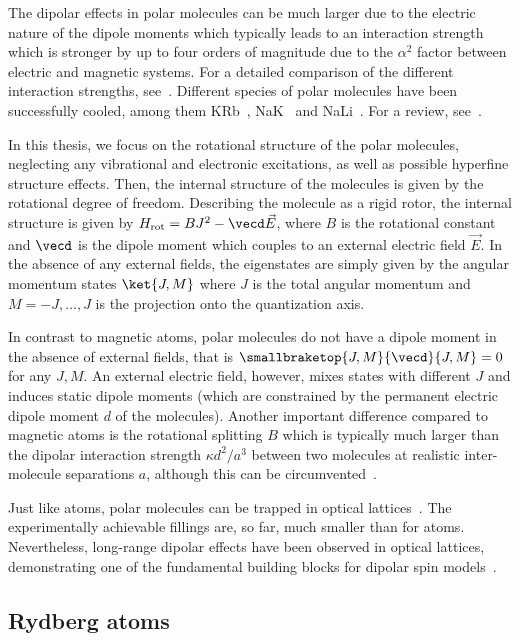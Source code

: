 The dipolar effects in polar molecules can be much larger due to the
electric nature of the dipole moments which typically leads to an interaction strength which
is stronger by up to four orders of magnitude due to the $\alpha^2$ factor between electric
and magnetic systems. For a detailed comparison of the different interaction strengths,
see~\cite{Lahaye2009}. Different species of polar molecules have been successfully cooled, among
them KRb~\cite{Ni2008b,Ospelkaus2010}, NaK~\cite{Wu2012a} and NaLi~\cite{Heo2012}. For a review,
see~\cite{Quemener2012}.

In this thesis, we focus on the rotational structure of the polar molecules,
neglecting any vibrational and electronic excitations, as well as possible hyperfine structure
effects. Then, the internal structure of the molecules is given by the rotational degree
of freedom. Describing the molecule as a rigid rotor, the internal structure is given by
$H_\text{rot}=B J^2 - \vecd \vec{E}$, where $B$ is the rotational constant and $\vecd$ is the
dipole moment which couples to an external electric field $\vec{E}$. In the absence of any external
fields, the eigenstates are simply given by the angular momentum states $\ket{J,M}$ where $J$ is
the total angular momentum and $M=-J, \dots, J$ is the projection onto the quantization axis.

In contrast to magnetic atoms, polar molecules do not have a dipole moment in the absence of
external fields, that is $\smallbraketop{J,M}{\vecd}{J,M}=0$ for any $J, M$. An external electric
field, however, mixes states with different $J$ and induces static dipole moments (which are
constrained by the permanent electric dipole moment $d$ of the molecules). Another important
difference compared to magnetic atoms is the rotational splitting $B$ which is typically much
larger than the dipolar interaction strength $\kappa d^2/a^3$ between two molecules at realistic
inter-molecule separations $a$, although this can be circumvented~\cite{Klinsmann2014}.

Just like atoms, polar molecules can be trapped in optical lattices~\cite{Chotia2012}. The
experimentally achievable fillings are, so far, much smaller than for atoms. Nevertheless,
long-range dipolar effects have been observed in optical lattices, demonstrating one of the
fundamental building blocks for dipolar spin models~\cite{Yan2013}.

\subsection{Rydberg atoms}

